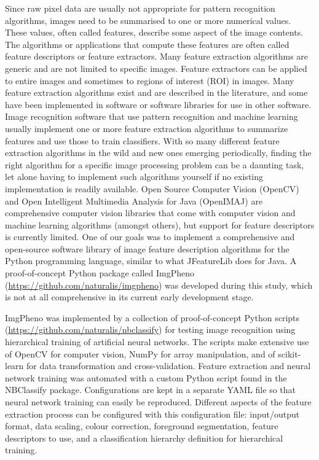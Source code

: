 \documentclass[twocolumn]{bmcart}
\begin{document}
Since raw pixel data are usually not appropriate for pattern recognition algorithms, images need to be summarised to one or more numerical values. These values, often called features, describe some aspect of the image contents. The algorithms or applications that compute these features are often called feature descriptors or feature extractors. Many feature extraction algorithms are generic and are not limited to specific images. Feature extractors can be applied to entire images and sometimes to regions of interest (ROI) in images. Many feature extraction algorithms exist and are described in the literature, and some have been implemented in software or software libraries for use in other software. Image recognition software that use pattern recognition and machine learning usually implement one or more feature extraction algorithms to summarize features and use those to train classifiers. With so many different feature extraction algorithms in the wild and new ones emerging periodically, finding the right algorithm for a specific image processing problem can be a daunting task, let alone having to implement such algorithms yourself if no existing implementation is readily available. Open Source Computer Vision (OpenCV) and Open Intelligent Multimedia Analysis for Java (OpenIMAJ) are comprehensive computer vision libraries that come with computer vision and machine learning algorithms (amongst others), but support for feature descriptors is currently limited. One of our goals was to implement a comprehensive and open-source software library of image feature description algorithms for the Python programming language, similar to what JFeatureLib does for Java. A proof-of-concept Python package called ImgPheno (\url{https://github.com/naturalis/imgpheno}) was developed during this study, which is not at all comprehensive in its current early development stage.

ImgPheno was implemented by a collection of proof-of-concept Python scripts (\url{https://github.com/naturalis/nbclassify}) for testing image recognition using hierarchical training of artificial neural networks. The scripts make extensive use of OpenCV \cite{Pulli2012} for computer vision, NumPy \cite{VanderWalt2011} for array manipulation, and of scikit-learn \cite{Pedregosa2011} for data transformation and cross-validation. Feature extraction and neural network training was automated with a custom Python script found in the NBClassify package. Configurations are kept in a separate YAML file so that neural network training can easily be reproduced. Different aspects of the feature extraction process can be configured with this configuration file: input/output format, data scaling, colour correction, foreground segmentation, feature descriptors to use, and a classification hierarchy definition for hierarchical training.
\end{document}
